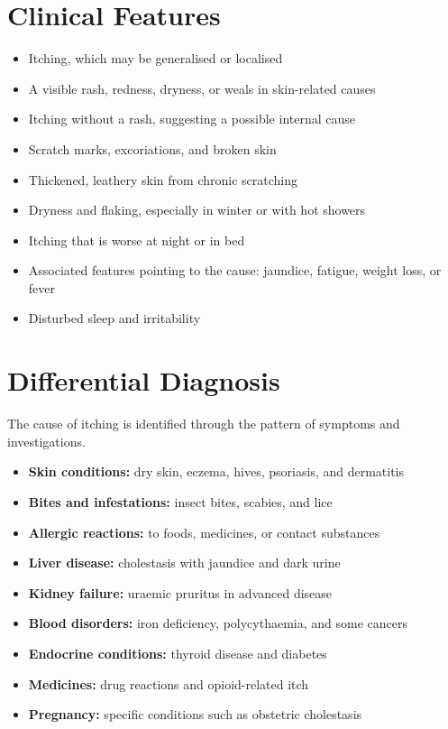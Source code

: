\section*{Clinical Features}
\begin{itemize}
    \item Itching, which may be generalised or localised
    \item A visible rash, redness, dryness, or weals in skin-related causes
    \item Itching without a rash, suggesting a possible internal cause
    \item Scratch marks, excoriations, and broken skin
    \item Thickened, leathery skin from chronic scratching
    \item Dryness and flaking, especially in winter or with hot showers
    \item Itching that is worse at night or in bed
    \item Associated features pointing to the cause: jaundice, fatigue, weight loss, or fever
    \item Disturbed sleep and irritability
\end{itemize}

\section*{Differential Diagnosis}
The cause of itching is identified through the pattern of symptoms and investigations.
\begin{itemize}
    \item \textbf{Skin conditions:} dry skin, eczema, hives, psoriasis, and dermatitis
    \item \textbf{Bites and infestations:} insect bites, scabies, and lice
    \item \textbf{Allergic reactions:} to foods, medicines, or contact substances
    \item \textbf{Liver disease:} cholestasis with jaundice and dark urine
    \item \textbf{Kidney failure:} uraemic pruritus in advanced disease
    \item \textbf{Blood disorders:} iron deficiency, polycythaemia, and some cancers
    \item \textbf{Endocrine conditions:} thyroid disease and diabetes
    \item \textbf{Medicines:} drug reactions and opioid-related itch
    \item \textbf{Pregnancy:} specific conditions such as obstetric cholestasis
\end{itemize}


